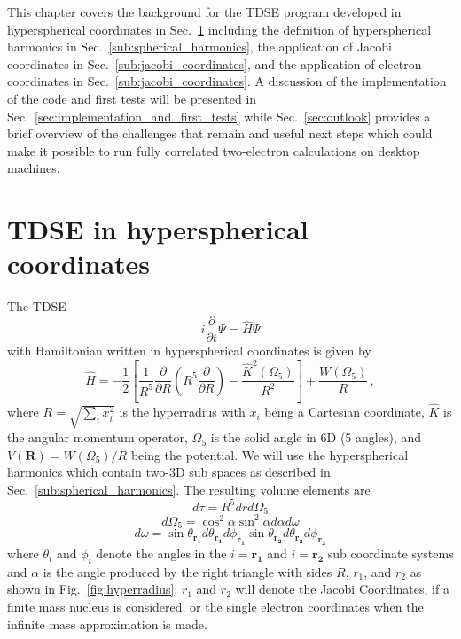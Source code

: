 This chapter covers the background for the TDSE program developed in hyperspherical coordinates in Sec.~\ref{sec:tdse_in_hyperspherical_coordinates} including the definition of hyperspherical harmonics in Sec.~\ref{sub:spherical_harmonics}, the application of Jacobi coordinates in Sec.~\ref{sub:jacobi_coordinates}, and the application of electron coordinates in Sec.~\ref{sub:jacobi_coordinates}. A discussion of the implementation of the code and first tests will be presented in Sec.~\ref{sec:implementation_and_first_tests} while Sec.~\ref{sec:outlook} provides a brief overview of the challenges that remain and useful next steps which could make it possible to run fully correlated two-electron calculations on desktop machines.

\section{TDSE in hyperspherical coordinates} %
\label{sec:tdse_in_hyperspherical_coordinates}
The TDSE
\begin{equation}
    i\frac{\partial}{\partial t}\Psi = \hat{H}\Psi
\end{equation}
with Hamiltonian written in hyperspherical coordinates is given by
\begin{equation}
   \hat{H} = -\frac{1}{2} \left[\frac{1}{R^5}\frac{\partial}{\partial R}\left(R^5\frac{\partial}{\partial R}\right) - \frac{\hat{K}^2(\Omega_5)}{R^2}\right] + \frac{W(\Omega_5)}{R}\, ,
\end{equation}
where $R=\sqrt{\sum_i x_i^2}$ is the hyperradius with $x_i$ being a Cartesian coordinate, $\hat{K}$ is the angular momentum operator, $\Omega_5$ is the solid angle in 6D (5 angles), and $V(\mathbf{R}) = W(\Omega_5)/R$ being the potential. We will use the hyperspherical harmonics which contain two-3D sub spaces as described in Sec.~\ref{sub:spherical_harmonics}. 
The resulting volume elements are 
\begin{equation}
    d\tau = R^5 dr d\Omega_5
\end{equation}
\begin{equation}
    d\Omega_5 = \cos^2\alpha \sin^2\alpha d\alpha d\omega
\end{equation}
\begin{equation}
    d\omega = \sin\theta_\mathbf{r_1} d\theta_\mathbf{r_1} d\phi_\mathbf{r_1} \sin\theta_\mathbf{r_2} d\theta_\mathbf{r_2} d\phi_\mathbf{r_2}
\end{equation}
where $\theta_i$ and $\phi_i$ denote the angles in the $i=\mathbf{r_1}$ and $i=\mathbf{r_2}$ sub coordinate systems and $\alpha$ is the angle produced by the right triangle with sides $R$, ${r_1}$, and ${r_2}$ as shown in Fig.~\ref{fig:hyperradius}. $r_1$ and $r_2$ will denote the Jacobi Coordinates, if a finite mass nucleus is considered, or the single electron coordinates when the infinite mass approximation is made.
